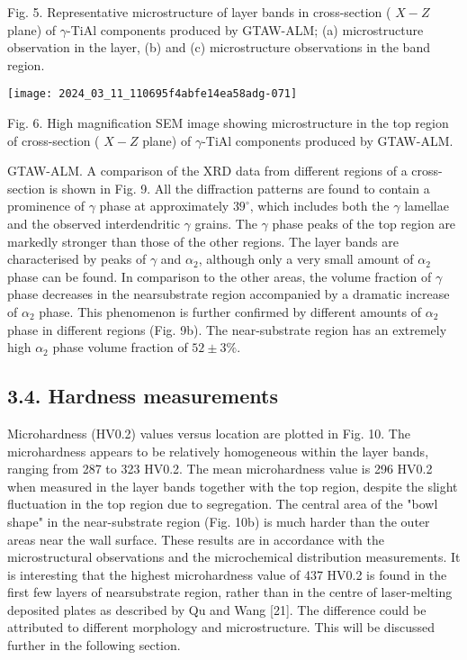 \documentclass[10pt]{article}
\begin{document}
Fig. 5. Representative microstructure of layer bands in cross-section ( $X-Z$ plane) of $\gamma$-TiAl components produced by GTAW-ALM; (a) microstructure observation in the layer, (b) and (c) microstructure observations in the band region.

\begin{center}
\texttt{[image: 2024\_03\_11\_110695f4abfe14ea58adg-071]}
\end{center}

Fig. 6. High magnification SEM image showing microstructure in the top region of cross-section ( $X-Z$ plane) of $\gamma$-TiAl components produced by GTAW-ALM.

GTAW-ALM. A comparison of the XRD data from different regions of a cross-section is shown in Fig. 9. All the diffraction patterns are found to contain a prominence of $\gamma$ phase at approximately $39^{\circ}$, which includes both the $\gamma$ lamellae and the observed interdendritic $\gamma$ grains. The $\gamma$ phase peaks of the top region are markedly stronger than those of the other regions. The layer bands are characterised by peaks of $\gamma$ and $\alpha_{2}$, although only a very small amount of $\alpha_{2}$ phase can be found. In comparison to the other areas, the volume fraction of $\gamma$ phase decreases in the nearsubstrate region accompanied by a dramatic increase of $\alpha_{2}$ phase. This phenomenon is further confirmed by different amounts of $\alpha_{2}$ phase in different regions (Fig. 9b). The near-substrate region has an extremely high $\alpha_{2}$ phase volume fraction of $52 \pm 3 \%$.

\subsection*{3.4. Hardness measurements}
Microhardness (HV0.2) values versus location are plotted in Fig. 10. The microhardness appears to be relatively homogeneous within the layer bands, ranging from 287 to 323 HV0.2. The mean microhardness value is 296 HV0.2 when measured in the layer bands together with the top region, despite the slight fluctuation in the top region due to segregation. The central area of the "bowl shape" in the near-substrate region (Fig. 10b) is much harder than the outer areas near the wall surface. These results are in accordance with the microstructural observations and the microchemical distribution measurements. It is interesting that the highest microhardness value of 437 HV0.2 is found in the first few layers of nearsubstrate region, rather than in the centre of laser-melting deposited plates as described by Qu and Wang [21]. The difference could be attributed to different morphology and microstructure. This will be discussed further in the following section.
\end{document}
